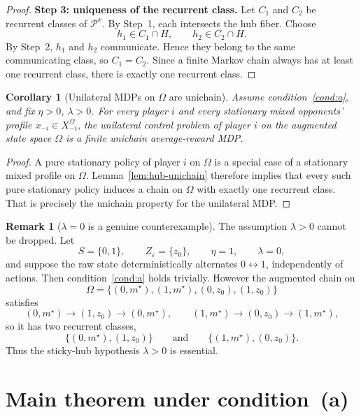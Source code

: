 \documentclass[11pt]{article}
\newtheorem{corollary}[theorem]{Corollary}
\theoremstyle{definition}
\newtheorem{remark}[theorem]{Remark}
\newcommand{\1}{\mathbf{1}}
\begin{document}
\begin{proof}
\smallskip
\noindent
\textbf{Step 3: uniqueness of the recurrent class.}
Let $C_1$ and $C_2$ be recurrent classes of $\mathcal P^x$. By Step~1, each intersects the hub fiber. Choose
\[
h_1\in C_1\cap H,
\qquad
h_2\in C_2\cap H.
\]
By Step~2, $h_1$ and $h_2$ communicate. Hence they belong to the same communicating class, so $C_1=C_2$. Since a finite Markov chain always has at least one recurrent class, there is exactly one recurrent class.
\end{proof}

\begin{corollary}[Unilateral MDPs on $\Omega$ are unichain]\label{cor:omega-unichain-mdp}
Assume condition~\ref{cond:a}, and fix $\eta>0$, $\lambda>0$. For every player $i$ and every stationary mixed opponents' profile $x_{-i}\in X_{-i}^\Omega$, the unilateral control problem of player $i$ on the augmented state space $\Omega$ is a finite unichain average-reward MDP.
\end{corollary}

\begin{proof}
A pure stationary policy of player $i$ on $\Omega$ is a special case of a stationary mixed profile on $\Omega$. Lemma~\ref{lem:hub-unichain} therefore implies that every such pure stationary policy induces a chain on $\Omega$ with exactly one recurrent class. That is precisely the unichain property for the unilateral MDP.
\end{proof}

\begin{remark}[$\lambda=0$ is a genuine counterexample]\label{rem:lambda-zero}
The assumption $\lambda>0$ cannot be dropped. Let
\[
S=\{0,1\},
\qquad
Z_\varepsilon=\{z_0\},
\qquad
\eta=1,
\qquad
\lambda=0,
\]
and suppose the raw state deterministically alternates $0\leftrightarrow1$, independently of actions. Then condition~\ref{cond:a} holds trivially. However the augmented chain on
\[
\Omega=\{(0,m^\star),(1,m^\star),(0,z_0),(1,z_0)\}
\]
satisfies
\[
(0,m^\star)\to(1,z_0)\to(0,m^\star),
\qquad
(1,m^\star)\to(0,z_0)\to(1,m^\star),
\]
so it has two recurrent classes,
\[
\{(0,m^\star),(1,z_0)\}
\qquad\text{and}\qquad
\{(1,m^\star),(0,z_0)\}.
\]
Thus the sticky-hub hypothesis $\lambda>0$ is essential.
\end{remark}

\section{Main theorem under condition~(a)}\label{sec:main}
\end{document}
